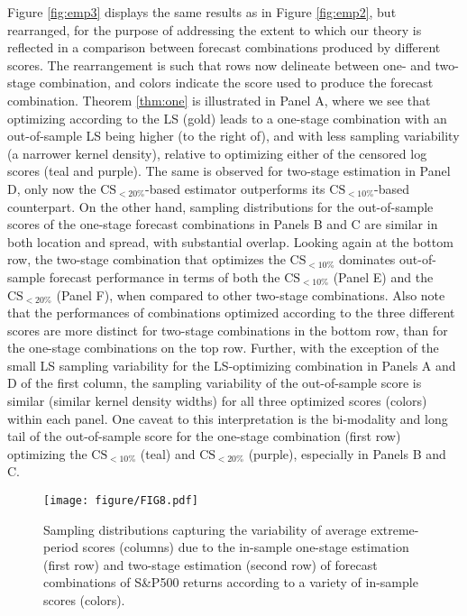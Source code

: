 \documentclass[12pt]{article}
\theoremstyle{definition}
\theoremstyle{remark}
\begin{document}
Figure \ref{fig:emp3} displays the same results as in Figure \ref{fig:emp2}, but rearranged, for the purpose of addressing the extent to which our theory is reflected in a comparison between forecast combinations produced by different scores. The rearrangement is such that rows now delineate between one- and two-stage combination, and colors indicate the score used to produce the forecast combination. Theorem \ref{thm:one} is illustrated in Panel A, where we see that optimizing according to the LS (gold) leads to a one-stage combination with an out-of-sample LS being higher (to the right of), and with less sampling variability (a narrower kernel density), relative to optimizing either of the censored log scores (teal and purple). The same is observed for two-stage estimation in Panel D, only now the $\mathrm{CS}_{<20\%}$-based estimator outperforms its $\mathrm{CS}_{<10\%}$-based counterpart. On the other hand, sampling distributions for the out-of-sample scores of the one-stage forecast combinations in Panels B and C are similar in both location and spread, with substantial overlap. Looking again at the bottom row, the two-stage combination that optimizes the $\mathrm{CS}_{<10\%}$ dominates out-of-sample forecast performance in terms of both the $\mathrm{CS}_{<10\%}$ (Panel E) and the $\mathrm{CS}_{<20\%}$ (Panel F), when compared to other two-stage combinations. Also note that the performances of combinations optimized according to the three different scores are more distinct for two-stage combinations in the bottom row, than for the one-stage combinations on the top row. Further, with the exception of the small LS sampling variability for the LS-optimizing combination in Panels A and D of the first column, the sampling variability of the out-of-sample score is similar (similar kernel density widths) for all three optimized scores (colors) within each panel. One caveat to this interpretation is the bi-modality and long tail of the out-of-sample score for the one-stage combination (first row) optimizing the $\mathrm{CS}_{<10\%} $ (teal) and $\mathrm{CS}_{<20\%}$ (purple), especially in Panels B and C.

\begin{figure}[t]
\texttt{[image: figure/FIG8.pdf]}
\caption{Sampling distributions capturing the variability of average extreme-period scores (columns) due to the in-sample one-stage estimation (first row) and two-stage estimation (second row) of forecast combinations of S\&P500 returns according to a variety of in-sample scores (colors).}
\label{fig:emp5}
\end{figure}
\end{document}
